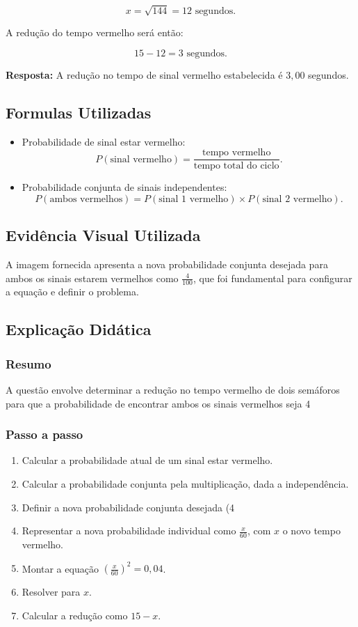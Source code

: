 \documentclass{article}
\begin{document}
\[
x = \sqrt{144} = 12 \text{ segundos}.
\]

A redução do tempo vermelho será então:

\[
15 - 12 = 3 \text{ segundos}.
\]

\textbf{Resposta:} A redução no tempo de sinal vermelho estabelecida é \(\boxed{3,00}\) segundos.

\subsection*{Formulas Utilizadas}
\begin{itemize}
  \item Probabilidade de sinal estar vermelho:
  \[
  P(\text{sinal vermelho}) = \frac{\text{tempo vermelho}}{\text{tempo total do ciclo}}.
  \]
  \item Probabilidade conjunta de sinais independentes:
  \[
  P(\text{ambos vermelhos}) = P(\text{sinal 1 vermelho}) \times P(\text{sinal 2 vermelho}).
  \]
\end{itemize}

\subsection*{Evidência Visual Utilizada}
A imagem fornecida apresenta a nova probabilidade conjunta desejada para ambos os sinais estarem vermelhos como \(\frac{4}{100}\), que foi fundamental para configurar a equação e definir o problema.

\subsection*{Explicação Didática}

\subsubsection*{Resumo}
A questão envolve determinar a redução no tempo vermelho de dois semáforos para que a probabilidade de encontrar ambos os sinais vermelhos seja 4%

\subsubsection*{Passo a passo}
\begin{enumerate}
  \item Calcular a probabilidade atual de um sinal estar vermelho.
  \item Calcular a probabilidade conjunta pela multiplicação, dada a independência.
  \item Definir a nova probabilidade conjunta desejada (4%
  \item Representar a nova probabilidade individual como \(\frac{x}{60}\), com \(x\) o novo tempo vermelho.
  \item Montar a equação \(\left(\frac{x}{60}\right)^2 = 0,04\).
  \item Resolver para \(x\).
  \item Calcular a redução como \(15 - x\).
\end{enumerate}
\end{document}
